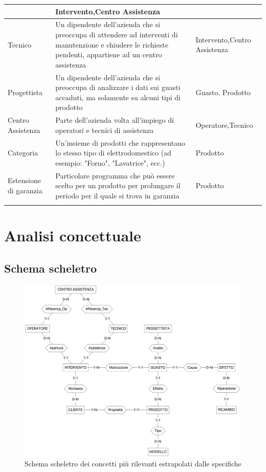 \documentclass[a4paper, 12pt]{report}
\begin{document}
\begin{tabularx}{\linewidth}{>{\hsize=0.375\hsize}X|X|>{\hsize=0.475\hsize}X}
	& Intervento,\newline Centro Assistenza\\
	\hline
	Tecnico & Un dipendente dell'azienda che si preoccupa di attendere ad interventi di manutenzione e chiudere le richieste pendenti, appartiene
	ad un centro assistenza & Intervento,\newline Centro Assistenza\\
	\hline
	Progettista & Un dipendente dell'azienda che si preoccupa di analizzare i dati sui guasti accaduti, ma solamente su alcuni tipi
	di prodotto & Guasto, Prodotto\\
	\hline
	Centro Assistenza & Parte dell'azienda volta all'impiego di operatori e tecnici di assistenza & Operatore,\newline Tecnico\\
	\hline
	Categoria & Un'insieme di prodotti che rappresentano lo stesso tipo di elettrodomestico (ad esempio: "Forno", "Lavatrice", ecc.) & Prodotto\\
	\hline
	Estensione di garanzia & Particolare programma che può essere scelto per un prodotto per prolungare il periodo per il quale si trova in garanzia & Prodotto\\
	\hline
	\caption{Glossario dei termini}
\end{tabularx}

\chapter{Analisi concettuale}

\section{Schema scheletro}

\begin{figure}[H]
	\centering
	\includegraphics[width=\linewidth]{images/skeleton.png}
	\caption{Schema scheletro dei concetti più rilevanti estrapolati dalle specifiche}
\end{figure}
\end{document}
